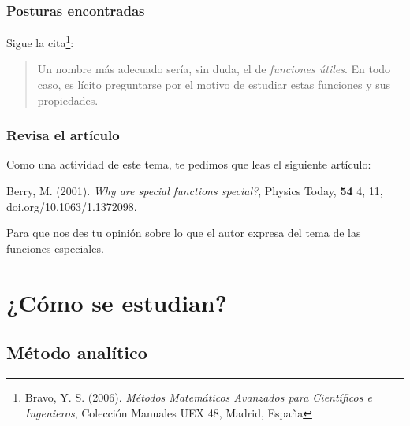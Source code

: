 \documentclass[12pt]{beamer}
\begin{document}
\begin{frame}
\frametitle{Posturas encontradas}
Sigue la cita\footnote{Bravo, Y. S. (2006). \textit{Métodos Matemáticos Avanzados para Científicos e Ingenieros}, Colección Manuales UEX 48, Madrid, España}:
\pause
\begin{quote}
Un nombre más adecuado sería, sin duda, el de \emph{funciones útiles}. En todo caso, es lícito preguntarse por el motivo de estudiar estas funciones y sus propiedades.
\end{quote}
\end{frame}
\begin{frame}
\frametitle{Revisa el artículo}
Como una actividad de este tema, te pedimos que leas el siguiente artículo: 
\begin{thebibliography}{X}
 Berry, M. (2001). \textit{Why are special functions special?}, Physics Today, \textbf{54} 4, 11, doi.org/10.1063/1.1372098.
\end{thebibliography}
Para que nos des tu opinión sobre lo que el autor expresa del tema de las funciones especiales.
\end{frame}

\section{¿Cómo se estudian?}
\subsection{Método analítico}
\end{document}

